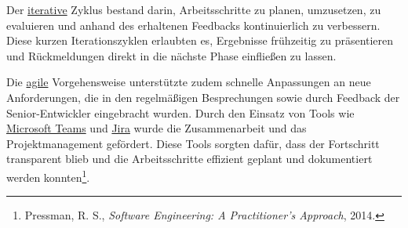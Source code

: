 Der \hyperlink{iterativ}{\textcolor{AOBlau}{iterative}} Zyklus bestand darin, Arbeitsschritte zu planen, umzusetzen, zu evaluieren und anhand des erhaltenen Feedbacks kontinuierlich zu verbessern. Diese kurzen Iterationszyklen erlaubten es, Ergebnisse frühzeitig zu präsentieren und Rückmeldungen direkt in die nächste Phase einfließen zu lassen. 

Die \hyperlink{agil}{\textcolor{AOBlau}{agile}} Vorgehensweise unterstützte zudem schnelle Anpassungen an neue Anforderungen, die in den regelmäßigen Besprechungen sowie durch Feedback der Senior-Entwickler eingebracht wurden. Durch den Einsatz von Tools wie \hyperlink{MicrosoftTeams}{\textcolor{AOBlau}{Microsoft Teams}} und \hyperlink{Jira}{\textcolor{AOBlau}{Jira}} wurde die Zusammenarbeit und das Projektmanagement gefördert. Diese Tools sorgten dafür, dass der Fortschritt transparent blieb und die Arbeitsschritte effizient geplant und dokumentiert werden konnten\footnote{Pressman, R. S., \textit{Software Engineering: A Practitioner's Approach}, 2014.}.
